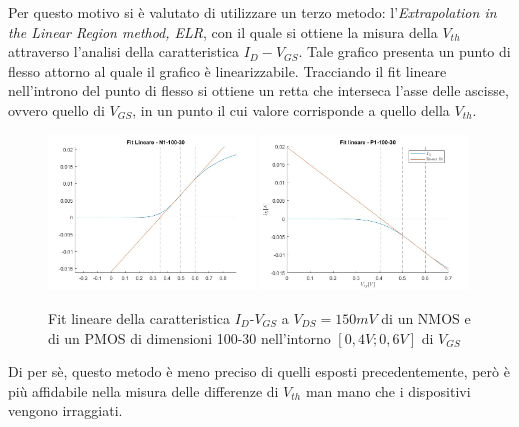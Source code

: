 \documentclass[12pt, letterpaper]{book}
\begin{document}
Per questo motivo si è valutato di utilizzare un terzo metodo: l'\emph{Extrapolation in the Linear Region method, ELR}, con il quale si ottiene la misura della $V_{th}$ attraverso l'analisi della caratteristica $I_D-V_{GS}$.  Tale grafico presenta un punto di flesso attorno al quale il grafico è linearizzabile. Tracciando il fit lineare nell'introno del punto di flesso si ottiene un retta che interseca l'asse delle ascisse, ovvero quello di $V_{GS}$, in un punto il cui valore corrisponde a quello della $V_{th}$.\\


\begin{figure}[h!]
\centering
 \includegraphics[width=0.49\textwidth]{LinearFit-N1-100-30}
 \includegraphics[width=0.49\textwidth]{LinearFit-P1-100-30}
 \caption{Fit lineare della caratteristica  $I_D$-$V_{GS}$ a $V_{DS}=150mV$ di un NMOS e di un PMOS di dimensioni 100-30 nell'intorno $[0,4V ; 0,6V]$ di $V_{GS}$}
\end{figure}

Di per sè, questo metodo è meno preciso di quelli esposti precedentemente, però è più affidabile nella misura delle differenze di $V_{th}$ man mano che i dispositivi vengono irraggiati.
\end{document}

